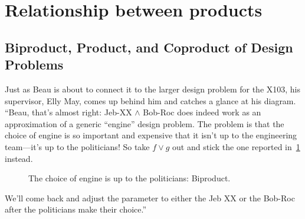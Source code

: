 \section{Relationship between products}
\subsection{Biproduct, Product, and Coproduct of Design Problems}
\begin{example}
Just as Beau is about to connect it to the larger design problem for the X103, his supervisor, Elly May, comes up behind him and catches a glance at his diagram. ``Beau, that's almost right: Jeb-XX $\wedge$ Bob-Roc does indeed work as an approximation of a generic ``engine'' design problem. The problem is that the choice of engine is so important and expensive that it isn't up to the engineering team---it's up to the politicians! So take $f \vee g$ out and stick the one reported in~\cref{fig:exbiproduct} instead.
\begin{figure}[h!]
\begin{center}
\end{center}
\caption{The choice of engine is up to the politicians: Biproduct. \label{fig:exbiproduct}}
\end{figure}

We'll come back and adjust the parameter to either the Jeb XX or the Bob-Roc after the politicians make their choice.''
\end{example}
